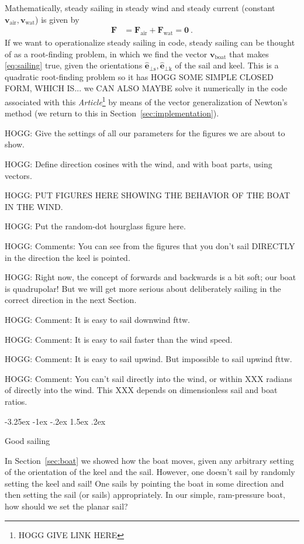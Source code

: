 \documentclass{article}
\makeatletter
\renewcommand{\vec}[1]{\boldsymbol{#1}}
\newcommand{\uvec}{\vec{\hat{e}}}
\newcommand{\air}{\text{air}}
\newcommand{\water}{\text{wat}}
\newcommand{\boat}{\text{boat}}
\newcommand{\sail}{\text{s}}
\newcommand{\keel}{\text{k}}
\newcommand{\vair}{\vec{v}_\air}
\newcommand{\vwater}{\vec{v}_\water}
\newcommand{\vboat}{\vec{v}_\boat}
\newcommand{\documentname}{\textsl{Article}}
\newcommand{\secref}[1]{Section~\ref{#1}}
\renewcommand\section{\@startsection {section}{1}{\z@}%
  {-3.25ex \@plus -1ex \@minus -.2ex}%
  {1.5ex \@plus .2ex}%
  {\raggedright\normalfont\large\bfseries}}
\makeatother
\begin{document}
Mathematically, steady sailing in steady wind and steady current (constant $\vair, \vwater$) is given by
\begin{align}\label{eq:sailing}
    \vec{F} &= \vec{F}_\air + \vec{F}_\water = \vec{0} ~.
\end{align}
If we want to operationalize steady sailing in code, steady sailing can be thought of as a root-finding problem, in which we find the vector $\vboat$ that makes \eqref{eq:sailing} true, given the orientations $\uvec_{\perp\sail}, \uvec_{\perp\keel}$ of the sail and keel.
This is a quadratic root-finding problem so it has HOGG SOME SIMPLE CLOSED FORM, WHICH IS... we CAN ALSO MAYBE solve it numerically in the code associated with this \documentname\footnote{HOGG GIVE LINK HERE} by means of the vector generalization of Newton's method (we return to this in \secref{sec:implementation}).

HOGG: Give the settings of all our parameters for the figures we are about to show.

HOGG: Define direction cosines with the wind, and with boat parts, using vectors.

HOGG: PUT FIGURES HERE SHOWING THE BEHAVIOR OF THE BOAT IN THE WIND.

HOGG: Put the random-dot hourglass figure here.

HOGG: Comments: You can see from the figures that you don't sail DIRECTLY in the direction the keel is pointed.

HOGG: Right now, the concept of forwards and backwards is a bit soft; our boat is quadrupolar! But we will get more serious about deliberately sailing in the correct direction in the next Section.

HOGG: Comment: It is easy to sail downwind fttw.

HOGG: Comment: It is easy to sail faster than the wind speed.

HOGG: Comment: It is easy to sail upwind. But impossible to sail upwind fttw.

HOGG: Comment: You can't sail directly into the wind, or within XXX radians of directly into the wind. This XXX depends on dimensionless sail and boat ratios.

\section{Good sailing}\label{sec:sailing}

In \secref{sec:boat} we showed how the boat moves, given any arbitrary setting of the orientation of the keel and the sail.
However, one doesn't sail by randomly setting the keel and sail!
One sails by pointing the boat in some direction and then setting the sail (or sails) appropriately.
In our simple, ram-pressure boat, how should we set the planar sail?
\end{document}

